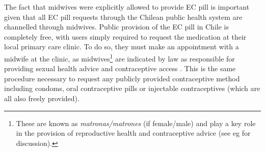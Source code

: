 \documentclass[12pt]{article}
\begin{document}
\begin{spacing}{1.9}
The fact that midwives were explicitly allowed to provide EC pill is important given that all EC pill requests through the Chilean public health system are channelled through midwives.  Public provision of the EC pill in Chile is completely free, with users simply required to request the medication at their local primary care clinic.  To do so, they must make an appointment with a midwife at the clinic, as midwives\footnote{These are known as \emph{matronas/matrones} (if female/male) and play a key role in the provision of reproductive health and contraceptive advice (see eg \citet{FinleyBabaetal2020} for discussion).} are indicated by law as responsible for providing sexual health advice and contraceptive access \citep{Congress2010}.  This is the same procedure necessary to request any publicly provided contraceptive method including condoms, oral contraceptive pills or injectable contraceptives (which are all also freely provided).


\end{spacing}
\end{document}
